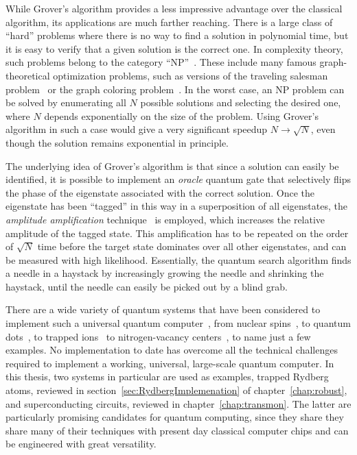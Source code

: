 While Grover's algorithm provides a less impressive advantage over the classical
algorithm, its applications are much farther reaching. There is a large class of
``hard'' problems where there is no way to find a solution in polynomial time,
but it is easy to verify that a given solution is the correct one.
In complexity theory, such problems belong to the category
``NP''~\cite{AroraBook}. These include many famous graph-theoretical
optimization problems, such as versions of the traveling salesman
problem~\cite{LawlerTSPBook} or the graph coloring
problem~\cite{JensenGraphColorBook}.
In the worst case, an NP problem can be solved by
enumerating all $N$ possible solutions and selecting the desired one, where $N$
depends exponentially on the size of the problem. Using Grover's algorithm in
such a case would give a very significant speedup $N \rightarrow \sqrt{N}$, even
though the solution remains exponential in principle.

The underlying idea of Grover's algorithm is that since a solution can easily be
identified, it is possible to implement an \emph{oracle}
quantum gate that selectively flips
the phase of the eigenstate associated with the correct solution. Once the
eigenstate has been ``tagged'' in this way in a superposition of all
eigenstates, the \emph{amplitude amplification}
technique~\cite{GroverPRL1998, BrassardISTCS1997} is employed, which increases
the relative amplitude of the tagged
state. This amplification has to be repeated on the order of $\sqrt{N}$ time
before the target state dominates over all other eigenstates, and can be
measured with high likelihood. Essentially, the quantum search algorithm finds
a needle in a haystack by increasingly growing the needle and shrinking the
haystack, until the needle can easily be picked out by a blind grab.

There are a wide variety of quantum systems that have been considered to
implement such a universal quantum computer~\cite{NielsenChuang}, from nuclear
spins~\cite{CoryPD1998}, to quantum dots~\cite{ImamogluPRL1999}, to trapped
ions~\cite{CiracPRL95} to nitrogen-vacancy centers~\cite{NizovtsevOS2005}, to
name just a few examples. No implementation to date has overcome all the
technical challenges required to implement a working, universal, large-scale
quantum computer.
In this thesis, two systems in particular are used as examples, trapped Rydberg
atoms, reviewed in section~\ref{sec:RydbergImplemenation} of
chapter~\ref{chap:robust}, and superconducting circuits, reviewed in
chapter~\ref{chap:transmon}. The latter are particularly promising candidates
for quantum computing, since they share they share many of their techniques with
present day classical computer chips and can be engineered with great
versatility.

